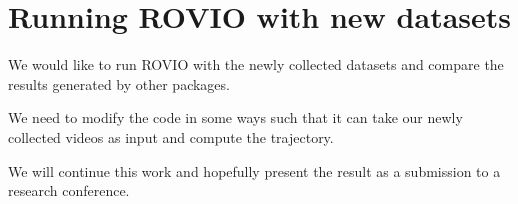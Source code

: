 \documentclass[11pt, oneside]{article}   	%
\begin{document}
\section{Running ROVIO with new datasets}
We would like to run ROVIO with the newly collected datasets and
compare the results generated by other packages.

We need to modify the code in some ways such that it can take our newly
collected videos as input and compute the trajectory. 

We will continue this work and hopefully present the result as a
submission to a research conference.
\end{document}
